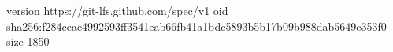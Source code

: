 version https://git-lfs.github.com/spec/v1
oid sha256:f284ceae4992593ff3541eab66fb41a1bdc5893b5b17b09b988dab5649c353f0
size 1850
